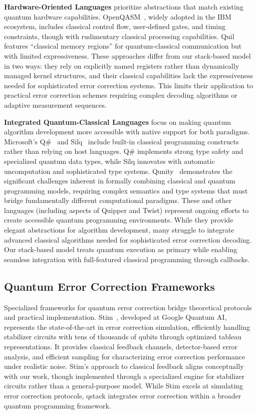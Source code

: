 \textbf{Hardware-Oriented Languages} prioritize abstractions that match existing quantum hardware capabilities. OpenQASM~\cite{cross2017open,cross2022openqasm}, widely adopted in the IBM ecosystem, includes classical control flow, user-defined gates, and timing constraints, though with rudimentary classical processing capabilities. Quil~\cite{smith2016practical} features ``classical memory regions'' for quantum-classical communication but with limited expressiveness. These approaches differ from our stack-based model in two ways: they rely on explicitly named registers rather than dynamically managed kernel structures, and their classical capabilities lack the expressiveness needed for sophisticated error correction systems. This limits their application to practical error correction schemes requiring complex decoding algorithms or adaptive measurement sequences.

\textbf{Integrated Quantum-Classical Languages} focus on making quantum algorithm development more accessible with native support for both paradigms. Microsoft's Q\#~\cite{qsharp} and Silq~\cite{silq} include built-in classical programming constructs rather than relying on host languages. Q\# implements strong type safety and specialized quantum data types, while Silq innovates with automatic uncomputation and sophisticated type systems. Qunity~\cite{voichick2023qunity} demonstrates the significant challenges inherent in formally combining classical and quantum programming models, requiring complex semantics and type systems that must bridge fundamentally different computational paradigms. These and other languages (including aspects of Quipper and Twist) represent ongoing efforts to create accessible quantum programming environments. While they provide elegant abstractions for algorithm development, many struggle to integrate advanced classical algorithms needed for sophisticated error correction decoding. Our stack-based model treats quantum execution as primary while enabling seamless integration with full-featured classical programming through callbacks.

\subsection{Quantum Error Correction Frameworks}

Specialized frameworks for quantum error correction bridge theoretical protocols and practical implementation. Stim~\cite{gidney2021stim}, developed at Google Quantum AI, represents the state-of-the-art in error correction simulation, efficiently handling stabilizer circuits with tens of thousands of qubits through optimized tableau representations. It provides classical feedback channels, detector-based error analysis, and efficient sampling for characterizing error correction performance under realistic noise. Stim's approach to classical feedback aligns conceptually with our work, though implemented through a specialized engine for stabilizer circuits rather than a general-purpose model. While Stim excels at simulating error correction protocols, qstack integrates error correction within a broader quantum programming framework.


